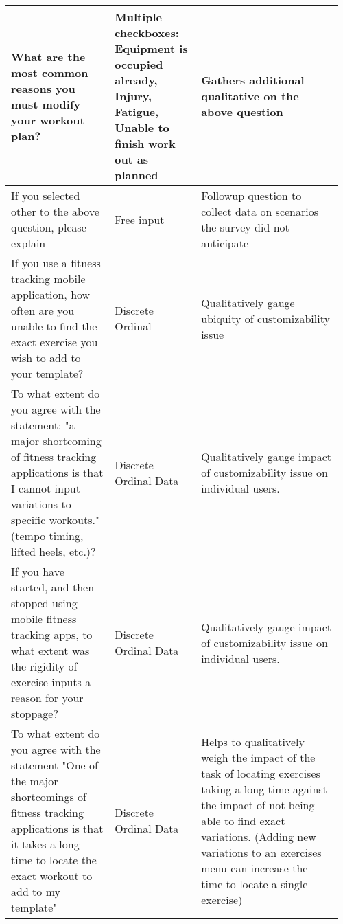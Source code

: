\documentclass[
	letterpaper, %
]{jdf}
\begin{document}
\begin{table}[H]
\begin{tabular}{L{0.30\linewidth} L{0.25\linewidth} L{0.41\linewidth}}
            \midrule
            What are the most common reasons you must modify your workout plan? & Multiple checkboxes: Equipment is occupied already, Injury, Fatigue, Unable to finish work out as planned & Gathers additional qualitative on the above question \\
            \midrule
            If you selected other to the above question, please explain & Free input & Followup question to collect data on scenarios the survey did not anticipate  \\
            \midrule
            If you use a fitness tracking mobile application, how often are you unable to find the exact exercise you wish to add to your template? & Discrete Ordinal & Qualitatively gauge ubiquity of customizability issue \\
            \midrule
            To what extent do you agree with the statement: "a major shortcoming of fitness tracking applications is that I cannot input variations to specific workouts." (tempo timing, lifted heels, etc.)? & Discrete Ordinal Data & Qualitatively gauge impact of customizability issue on individual users. \\
            \midrule
            If you have started, and then stopped using mobile fitness tracking apps, to what extent was the rigidity of exercise inputs a reason for your stoppage? & Discrete Ordinal Data & Qualitatively gauge impact of customizability issue on individual users. \\
            \midrule
            To what extent do you agree with the statement "One of the major shortcomings of fitness tracking applications is that it takes a long time to locate the exact workout to add to my template" & Discrete Ordinal Data & Helps to qualitatively weigh the impact of the task of locating exercises taking a long time against the impact of not being able to find exact variations. (Adding new variations to an exercises menu can increase the time to locate a single exercise) \\
	\end{tabular}
\end{table}
\end{document}
